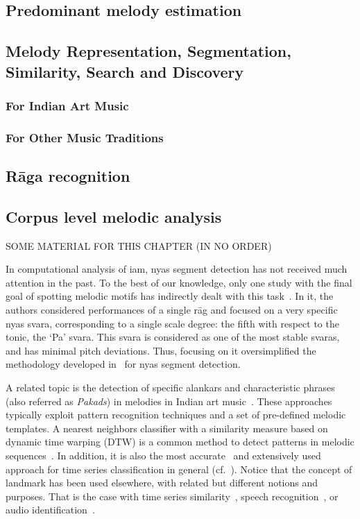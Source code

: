 \subsection{Predominant melody estimation}
\subsection{Melody Representation, Segmentation, Similarity, Search and Discovery}
\subsubsection{For Indian Art Music}
\subsubsection{For Other Music Traditions}
\subsection{R\={a}ga recognition}
\subsection{Corpus level melodic analysis}

SOME MATERIAL FOR THIS CHAPTER (IN NO ORDER)

In computational analysis of \gls{iam}, \gls{nyas} segment detection has not received much attention in the past. To the best of our knowledge, only one study with the final goal of spotting melodic motifs has indirectly dealt with this task~\citep{Ross2012}. In it, the authors considered performances of a single r\={a}g and focused on a very specific \gls{nyas} \gls{svara}, corresponding to a single scale degree: the fifth with respect to the tonic, the `Pa' \gls{svara}. This \gls{svara} is considered as one of the most stable \glspl{svara}, and has minimal pitch deviations. Thus, focusing on it oversimplified the methodology developed in~\cite{Ross2012} for \gls{nyas} segment detection.  

A related topic is the detection of specific \glspl{alankar} and characteristic phrases (also referred as {\it Pakads}) in melodies in Indian art music~\cite{Datta2007, Pratyush2010, Ross2012b, Ishwar2013}. These approaches typically exploit pattern recognition techniques and a set of pre-defined melodic templates. A nearest neighbors classifier with a similarity measure based on dynamic time warping (DTW) is a common method to detect patterns in melodic sequences~\cite{Pratyush2010, Ross2012b}. In addition, it is also the most accurate~\cite{Xi06ICML} and extensively used approach for time series classification in general (cf.~\cite{Wang12DMKD}). Notice that the concept of landmark has been used elsewhere, with related but different notions and purposes. That is the case with time series similarity~\cite{Perng00ICDE}, speech recognition~\cite{Jansen08JASA,Chen12ICASSP}, or audio identification~\cite{Duong13ICASSP}.


